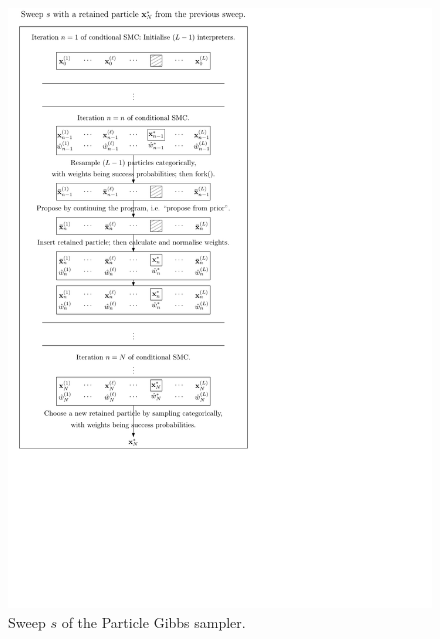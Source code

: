 \begin{figure}[!htb]
\centering
\includegraphics[scale=0.8]{pprog/how/figures/pgibbs/pgibbs2}
\caption{Sweep $s$ of the Particle Gibbs sampler.}
\label{fig:pprog/how/figures/pgibbs2}
\end{figure}